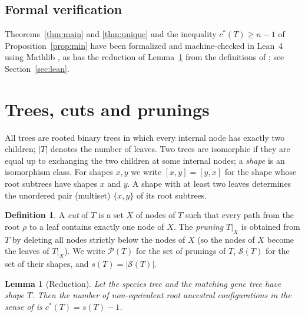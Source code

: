 \documentclass[11pt]{amsart}
\newtheorem{lemma}[theorem]{Lemma}
\theoremstyle{definition}
\newtheorem{definition}[theorem]{Definition}
\theoremstyle{remark}
\newcommand{\Sh}{\mathcal{S}}
\newcommand{\Prn}{\mathcal{P}}
\newcommand{\cstar}{c^{*}}
\begin{document}
\subsection*{Formal verification}
Theorems~\ref{thm:main} and \ref{thm:unique} and the inequality $\cstar(T)\ge n-1$ of Proposition~\ref{prop:min} have been formalized and machine-checked in Lean~4 \cite{Lean4} using Mathlib \cite{Mathlib}, as has the reduction of Lemma~\ref{lem:reduction} from the definitions of \cite{DR2019}; see Section~\ref{sec:lean}.

\section{Trees, cuts and prunings}\label{sec:prunings}

All trees are rooted binary trees in which every internal node has exactly two children; $|T|$ denotes the number of leaves.
Two trees are isomorphic if they are equal up to exchanging the two children at some internal nodes; a \emph{shape} is an isomorphism class.
For shapes $x,y$ we write $[x,y]=[y,x]$ for the shape whose root subtrees have shapes $x$ and $y$.
A shape with at least two leaves determines the unordered pair (multiset) $\{x,y\}$ of its root subtrees.

\begin{definition}
A \emph{cut} of $T$ is a set $X$ of nodes of $T$ such that every path from the root $\rho$ to a leaf contains exactly one node of $X$.
The \emph{pruning} $T|_X$ is obtained from $T$ by deleting all nodes strictly below the nodes of $X$ (so the nodes of $X$ become the leaves of $T|_X$).
We write $\Prn(T)$ for the set of prunings of $T$, $\Sh(T)$ for the set of their shapes, and $s(T)=|\Sh(T)|$.
\end{definition}

\begin{lemma}[Reduction]\label{lem:reduction}
Let the species tree and the matching gene tree have shape $T$.
Then the number of non-equivalent root ancestral configurations in the sense of \cite{DR2019} is $\cstar(T)=s(T)-1$.
\end{lemma}
\end{document}
